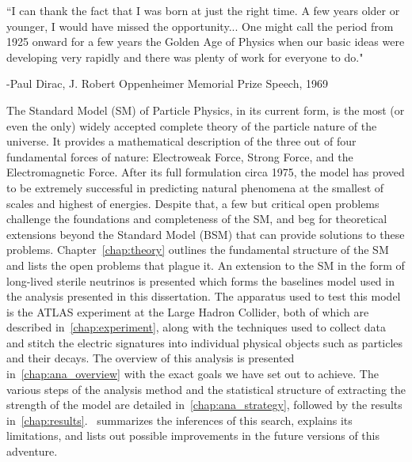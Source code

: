 \vspace{1in}
{\large
``I can thank the fact that I was born at just the right time. A few years older or younger, I would have missed the opportunity... One might call the period from 1925 onward for a few years the Golden Age of Physics when our basic ideas were developing very rapidly and there was plenty of work for everyone to do."

\hfill -Paul Dirac, J. Robert Oppenheimer Memorial Prize Speech, 1969}
\vspace{1in}

The Standard Model (SM) of Particle Physics, in its current form, is the most (or even the only) widely accepted complete theory of the particle nature of the universe. It provides a mathematical description of the three out of four fundamental forces of nature: Electroweak Force, Strong Force, and the Electromagnetic Force. After its full formulation circa 1975, the model has proved to be extremely successful in predicting natural phenomena at the smallest of scales and highest of energies. Despite that, a few but critical open problems challenge the foundations and completeness of the SM, and beg for theoretical extensions beyond the Standard Model (BSM) that can provide solutions to these problems. Chapter~\ref{chap:theory} outlines the fundamental structure of the SM and lists the open problems that plague it. An extension to the SM in the form of long-lived sterile neutrinos is presented which forms the baselines model used in the analysis presented in this dissertation. The apparatus used to test this model is the ATLAS experiment at the Large Hadron Collider, both of which are described in~\cref{chap:experiment}, along with the techniques used to collect data and stitch the electric signatures into individual physical objects such as particles and their decays. The overview of this analysis is presented in~\cref{chap:ana_overview} with the exact goals we have set out to achieve. The various steps of the analysis method and the statistical structure of extracting the strength of the model are detailed in~\cref{chap:ana_strategy}, followed by the results in~\cref{chap:results}.~ summarizes the inferences of this search, explains its limitations, and lists out possible improvements in the future versions of this adventure.
